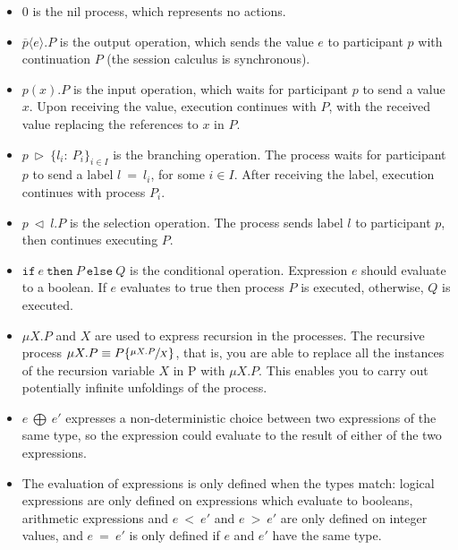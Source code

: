 \documentclass[12pt,twoside]{report}
\begin{document}
\begin{itemize}
    \item $0$ is the nil process, which represents no actions.
    \item $\overline{p} \langle e \rangle.P$ is the output operation, which sends the value $e$ to participant $p$ with continuation $P$ (the session calculus is synchronous).
    \item $p(x).P$ is the input operation, which waits for participant $p$ to send a value $x$. Upon receiving the value, execution continues with $P$, with the received value replacing the references to $x$ in $P$.
    
    \item $p\ \triangleright\ \{l_i:\ P_i\}_{i\in I}$ is the branching operation. The process waits for participant $p$ to send a label $l\ =\ l_i$, for some $i \in I$. After receiving the label, execution continues with process $P_i$.
    
    \item $p\ \triangleleft\ l.P$ is the selection operation. The process sends label $l$ to participant $p$, then continues executing $P$.
    
    \item $\texttt{if}\ e\ \texttt{then}\ P\ \texttt{else}\ Q$ is the conditional operation. Expression $e$ should evaluate to a boolean. If $e$ evaluates to true then process $P$ is executed, otherwise, $Q$ is executed.
    
    \item $\mu X.P$ and $X$ are used to express recursion in the processes. The recursive process $\mu X.P \equiv P\{\sfrac{\mu X.P}{X}\}$, that is, you are able to replace all the instances of the recursion variable $X$ in P with $\mu X.P$. This enables you to carry out potentially infinite unfoldings of the process.
    
    \item $e\ \bigoplus\ e'$ expresses a non-deterministic choice between two expressions of the same type, so the expression could evaluate to the result of either of the two expressions. 
    
    \item The evaluation of expressions is only defined when the types match: logical expressions are only defined on expressions which evaluate to booleans, arithmetic expressions and $e\ <\ e'$ and $e\ >\ e'$ are only defined on integer values, and $e\ =\ e'$ is only defined if $e$ and $e'$ have the same type.
\end{itemize}{}
\end{document}
